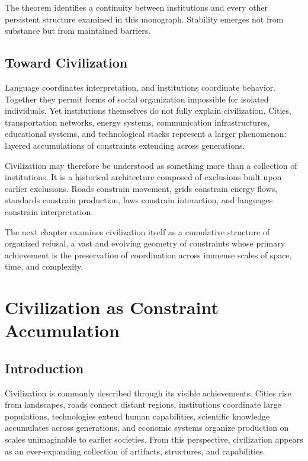 \documentclass[11pt,oneside]{book}
\theoremstyle{plain}
\theoremstyle{definition}
\theoremstyle{remark}
\begin{document}
The theorem identifies a continuity between institutions and every other persistent structure examined in this monograph. Stability emerges not from substance but from maintained barriers.

\section{Toward Civilization}

Language coordinates interpretation, and institutions coordinate behavior. Together they permit forms of social organization impossible for isolated individuals. Yet institutions themselves do not fully explain civilization. Cities, transportation networks, energy systems, communication infrastructures, educational systems, and technological stacks represent a larger phenomenon: layered accumulations of constraints extending across generations.

Civilization may therefore be understood as something more than a collection of institutions. It is a historical architecture composed of exclusions built upon earlier exclusions. Roads constrain movement, grids constrain energy flows, standards constrain production, laws constrain interaction, and languages constrain interpretation.

The next chapter examines civilization itself as a cumulative structure of organized refusal, a vast and evolving geometry of constraints whose primary achievement is the preservation of coordination across immense scales of space, time, and complexity.

\chapter{Civilization as Constraint Accumulation}

\section{Introduction}

Civilization is commonly described through its visible achievements. Cities rise from landscapes, roads connect distant regions, institutions coordinate large populations, technologies extend human capabilities, scientific knowledge accumulates across generations, and economic systems organize production on scales unimaginable to earlier societies. From this perspective, civilization appears as an ever-expanding collection of artifacts, structures, and capabilities.
\end{document}
